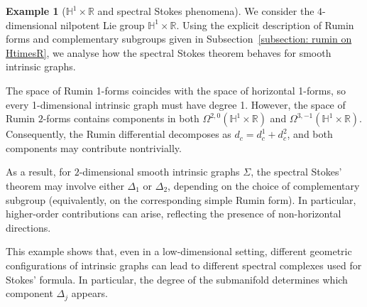 \documentclass[dvipsnames]{amsart}
\theoremstyle{definition}
\newtheorem{example}[theorem]{Example}
\theoremstyle{definition}
\numberwithin{equation}{section}
\begin{document}
\begin{example}[$\mathbb{H}^1\times\mathbb{R}$ and spectral Stokes phenomena]
\label{ex: H1xR spectral}
We consider the $4$-dimensional nilpotent Lie group $\mathbb{H}^1\times\mathbb{R}$. 
Using the explicit description of Rumin forms and complementary subgroups given in Subsection~\ref{subsection: rumin on HtimesR}, we analyse how the spectral Stokes theorem behaves for smooth intrinsic graphs.

The space of Rumin 1-forms coincides with the space of horizontal 1-forms, so every 1-dimensional intrinsic graph must have degree 1. However, the space of Rumin $2$-forms contains components in both
$\Omega^{2,0}(\mathbb{H}^1\times\mathbb{R})
$ and $\Omega^{3,-1}(\mathbb{H}^1\times\mathbb{R})$.
Consequently, the Rumin differential decomposes as $d_c = d_c^1 + d_c^2$,
and both components may contribute nontrivially.


As a result, for $2$-dimensional smooth intrinsic graphs $\Sigma$, the spectral Stokes' theorem may involve either $\Delta_1$ or $\Delta_2$, depending on the choice of complementary subgroup (equivalently, on the corresponding simple Rumin form). In particular, higher-order contributions can arise, reflecting the presence of non-horizontal directions.


This example shows that, even in a low-dimensional setting, different geometric configurations of intrinsic graphs can lead to different spectral complexes used for Stokes' formula. In particular, the degree of the submanifold determines which component $\Delta_j$ appears.
\end{example}
\end{document}
